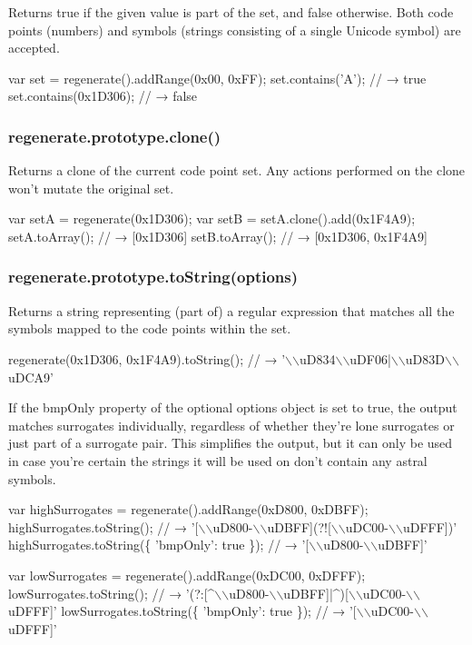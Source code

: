 Returns {\ttfamily true} if the given value is part of the set, and {\ttfamily false} otherwise. Both code points (numbers) and symbols (strings consisting of a single Unicode symbol) are accepted.


\begin{DoxyCode}
var set = regenerate().addRange(0x00, 0xFF);
set.contains('A');
// → true
set.contains(0x1D306);
// → false
\end{DoxyCode}


\subsubsection*{{\ttfamily regenerate.\+prototype.\+clone()}}

Returns a clone of the current code point set. Any actions performed on the clone won’t mutate the original set.


\begin{DoxyCode}
var setA = regenerate(0x1D306);
var setB = setA.clone().add(0x1F4A9);
setA.toArray();
// → [0x1D306]
setB.toArray();
// → [0x1D306, 0x1F4A9]
\end{DoxyCode}


\subsubsection*{{\ttfamily regenerate.\+prototype.\+to\+String(options)}}

Returns a string representing (part of) a regular expression that matches all the symbols mapped to the code points within the set.


\begin{DoxyCode}
regenerate(0x1D306, 0x1F4A9).toString();
// → '\(\backslash\)\(\backslash\)uD834\(\backslash\)\(\backslash\)uDF06|\(\backslash\)\(\backslash\)uD83D\(\backslash\)\(\backslash\)uDCA9'
\end{DoxyCode}


If the {\ttfamily bmp\+Only} property of the optional {\ttfamily options} object is set to {\ttfamily true}, the output matches surrogates individually, regardless of whether they’re lone surrogates or just part of a surrogate pair. This simplifies the output, but it can only be used in case you’re certain the strings it will be used on don’t contain any astral symbols.


\begin{DoxyCode}
var highSurrogates = regenerate().addRange(0xD800, 0xDBFF);
highSurrogates.toString();
// → '[\(\backslash\)\(\backslash\)uD800-\(\backslash\)\(\backslash\)uDBFF](?![\(\backslash\)\(\backslash\)uDC00-\(\backslash\)\(\backslash\)uDFFF])'
highSurrogates.toString(\{ 'bmpOnly': true \});
// → '[\(\backslash\)\(\backslash\)uD800-\(\backslash\)\(\backslash\)uDBFF]'

var lowSurrogates = regenerate().addRange(0xDC00, 0xDFFF);
lowSurrogates.toString();
// → '(?:[^\(\backslash\)\(\backslash\)uD800-\(\backslash\)\(\backslash\)uDBFF]|^)[\(\backslash\)\(\backslash\)uDC00-\(\backslash\)\(\backslash\)uDFFF]'
lowSurrogates.toString(\{ 'bmpOnly': true \});
// → '[\(\backslash\)\(\backslash\)uDC00-\(\backslash\)\(\backslash\)uDFFF]'
\end{DoxyCode}


